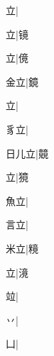 \begin{multicols}{2}
{{立}|{}\par
{立}|{\cjk{}镜}\par
{立}|{\cjk{}傹}\par
{\cjk{}{\cnsym{}　}金立}|{\cjk{}鏡}\par
{立}|{}\par
{\cjk{}{\cnsym{}　}豸立}|{}\par
{\cjk{}日儿立}|{\cjk{}竸}\par
{立}|{\cjk{}獍}\par
{\cjk{}{\cnsym{}　}魚立}|{}\par
{\cjk{}{\cnsym{}　}言立}|{}\par
{\cjk{}{\cnsym{}　}米立}|{\cjk{}糡}\par
{立}|{\cjk{}滰}\par
{\cjk{}{\cnsym{}　}{\cnsym{}　}竝}|{}\par
{丷}|{}\par
{\cjk{}{\cnsym{}　}{\cnsym{}　}凵}|{}\par
}
\end{multicols}
